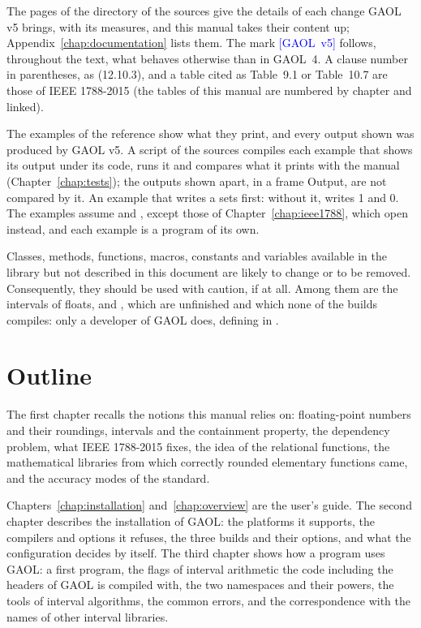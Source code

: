 \medskip
The pages of the directory  of the sources give the details of each
change GAOL v5 brings, with its measures, and this manual takes their content
up; Appendix~\ref{chap:documentation} lists them. The mark
\textcolor{blue}{\textsf{\scriptsize[GAOL~v5]}} follows, throughout the
text, what behaves otherwise than in GAOL~4. A clause number in parentheses,
as (12.10.3), and a table cited as Table~9.1 or Table~10.7 are those of
IEEE 1788-2015 (the tables of this manual are numbered by chapter and linked).

\medskip
The examples of the reference show what they print, and every output shown
was produced by GAOL v5. A script of the sources compiles each example that
shows its output under its code, runs it and compares what it prints with the
manual (Chapter~\ref{chap:tests}); the outputs shown apart, in a frame
Output, are not compared by it. An
example that writes a  sets  first: without it,
 writes 1 and 0. The examples assume 
and , except those of
Chapter~\ref{chap:ieee1788}, which open  instead, and
each example is a program of its own.

\medskip
Classes, methods, functions, macros, constants and variables available in
the library but not described in this document are likely to change or to be
removed. Consequently, they should be used with caution, if at all. Among
them are the intervals of floats,  and
, which are unfinished and which none of the builds
compiles: only a developer of GAOL does, defining
 in .
%
%

\section*{Outline}

The first chapter recalls the notions this manual relies on: floating-point
numbers and their roundings, intervals and the containment property, the
dependency problem, what IEEE 1788-2015 fixes, the idea of the relational
functions, the mathematical libraries from which correctly rounded
elementary functions came, and the accuracy modes of the standard.

\medskip
Chapters~\ref{chap:installation} and~\ref{chap:overview} are the user's
guide. The second chapter describes the installation of GAOL: the platforms
it supports, the compilers and options it refuses, the three builds and their
options, and what the configuration decides by itself. The third chapter
shows how a program uses GAOL: a first program, the flags of interval
arithmetic the code including the headers of GAOL is compiled with, the two
namespaces and their powers, the tools of interval algorithms, the common
errors, and the correspondence with the names of other interval libraries.

